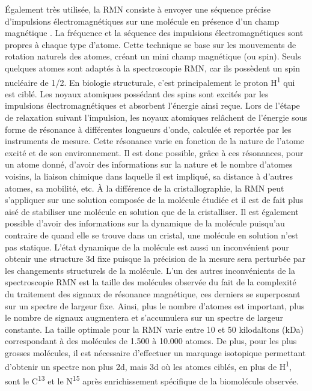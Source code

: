 Également très utilisée, la RMN consiste à envoyer une séquence précise d'impulsions électromagnétiques sur une molécule en présence d'un champ magnétique \cite{wuthrich1986nmr}. La fréquence et la séquence des impulsions électromagnétiques sont propres à chaque type d'atome. Cette technique se base sur les mouvements de rotation naturels des atomes, créant un mini champ magnétique (ou spin). Seuls quelques atomes sont adaptés à la spectroscopie RMN, car ils possèdent un spin nucléaire de 1/2. En biologie structurale, c'est principalement le proton H\textsuperscript{1} qui est ciblé. Les noyaux atomiques possédant des spins sont excités par les impulsions électromagnétiques et absorbent l'énergie ainsi reçue. Lors de l'étape de relaxation suivant l'impulsion, les noyaux atomiques relâchent de l'énergie sous forme de résonance à différentes longueurs d'onde, calculée et reportée par les instruments de mesure. Cette résonance varie en fonction de la nature de l'atome excité et de son environnement. Il est donc possible, grâce à ces résonances, pour un atome donné, d'avoir des informations sur la nature et le nombre d'atomes voisins, la liaison chimique dans laquelle il est impliqué, sa distance à d'autres atomes, sa mobilité, etc. À la différence de la cristallographie, la RMN peut s'appliquer sur une solution composée de la molécule étudiée et il est de fait plus aisé de stabiliser une molécule en solution que de la cristalliser. Il est également possible d'avoir des informations sur la dynamique de la molécule puisqu'au contraire de quand elle se trouve dans un cristal, une molécule en solution n'est pas statique.
L'état dynamique de la molécule est aussi un inconvénient pour obtenir une structure 3d fixe puisque la précision de la mesure sera perturbée par les changements structurels de la molécule. L'un des autres inconvénients de la spectroscopie RMN est la taille des molécules observée du fait de la complexité du traitement des signaux de résonance magnétique, ces derniers se superposant sur un spectre de largeur fixe. Ainsi, plus le nombre d'atomes est important, plus le nombre de signaux augmentera et s'accumulera sur un spectre de largeur constante. La taille optimale pour la RMN varie entre 10 et 50 kilodaltons (kDa) correspondant à des molécules de 1.500 à 10.000 atomes. De plus, pour les plus grosses molécules, il est nécessaire d'effectuer un marquage isotopique permettant d'obtenir un spectre non plus 2d, mais 3d où les atomes ciblés, en plus de H\textsuperscript{1}, sont le C\textsuperscript{13} et le N\textsuperscript{15} après enrichissement spécifique de la biomolécule observée.

